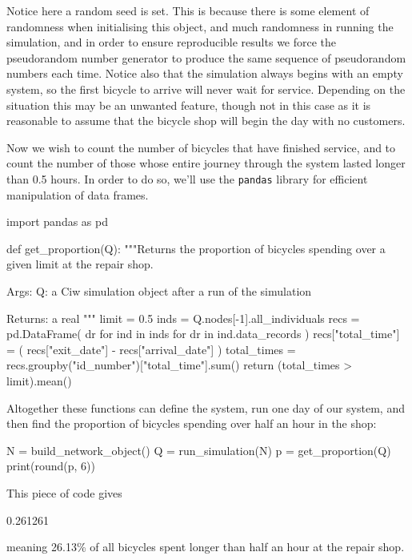 Notice here a random seed is set. This is because there is some element of
randomness when initialising this object, and much randomness in running
the simulation, and in order to ensure reproducible
results we force the pseudorandom number generator to produce the same sequence
of pseudorandom numbers each time.
Notice also that the simulation always begins with an empty system, so the first
bicycle to arrive will never wait for service. Depending on the situation this
may be an unwanted feature, though not in this case as it is reasonable to
assume that the bicycle shop will begin the day with no customers.

Now we wish to count the number of bicycles that have finished service, and to
count the number of those whose entire journey through the system lasted longer
than 0.5 hours. In order to do so, we'll use the \texttt{pandas}
library for efficient manipulation of data frames.

\begin{pyin}
import pandas as pd


def get_proportion(Q):
    """Returns the proportion of bicycles spending over a given
    limit at the repair shop.

    Args:
        Q: a Ciw simulation object after a run of the
           simulation

    Returns:
        a real
    """
    limit = 0.5
    inds = Q.nodes[-1].all_individuals
    recs = pd.DataFrame(
        dr for ind in inds for dr in ind.data_records
    )
    recs["total_time"] = (
        recs["exit_date"] - recs["arrival_date"]
    )
    total_times = recs.groupby("id_number")["total_time"].sum()
    return (total_times > limit).mean()
\end{pyin}

Altogether these functions can define the system, run one day of our system, and
then find the proportion of bicycles spending over half an hour in the shop:

\begin{pyin}
N = build_network_object()
Q = run_simulation(N)
p = get_proportion(Q)
print(round(p, 6))
\end{pyin}

This piece of code gives

\begin{pyout}
0.261261
\end{pyout}

meaning 26.13\% of all bicycles spent longer than half an hour at the repair
shop.

